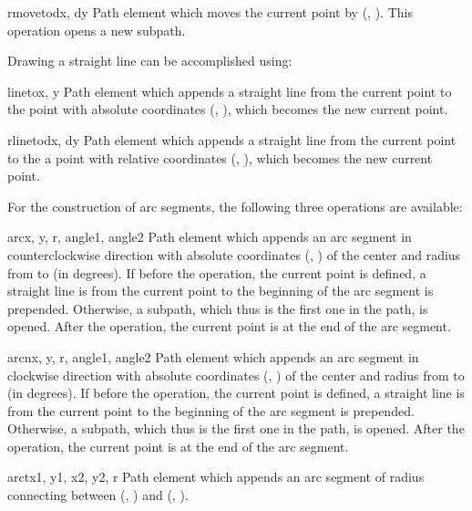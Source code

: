 \begin{classdesc}{rmoveto}{dx, dy}
Path element which moves the current point by (, ). 
This operation opens a new subpath. 
\end{classdesc}

Drawing a straight line can be accomplished using:

\begin{classdesc}{lineto}{x, y}
Path element which appends a straight line from the current point to the
point with absolute coordinates (, ), which becomes
the new current point. 
\end{classdesc}

\begin{classdesc}{rlineto}{dx, dy}
Path element which appends a straight line from the current point to the
a point with relative coordinates (, ), which becomes
the new current point. 
\end{classdesc}

For the construction of arc segments, the following three operations
are available:

\begin{classdesc}{arc}{x, y, r, angle1, angle2}
Path element which appends an arc segment in counterclockwise direction
with absolute coordinates (, ) of the center and 
radius  from  to  (in degrees). 
If before the operation, the current point is defined, a straight line
is from the current point to the beginning of the arc segment is
prepended. Otherwise, a subpath, which thus is the first one in the
path, is opened. After the operation, the current point is at the end
of the arc segment. 
\end{classdesc}

\begin{classdesc}{arcn}{x, y, r, angle1, angle2}
Path element which appends an arc segment in clockwise direction
with absolute coordinates (, ) of the center and 
radius  from  to  (in degrees). 
If before the operation, the current point is defined, a straight line
is from the current point to the beginning of the arc segment is
prepended. Otherwise, a subpath, which thus is the first one in the
path, is opened. After the operation, the current point is at the end
of the arc segment. 
\end{classdesc}

\begin{classdesc}{arct}{x1, y1, x2, y2, r}
Path element which appends an arc segment of radius 
connecting between (, ) and (, ).\\
\end{classdesc}

